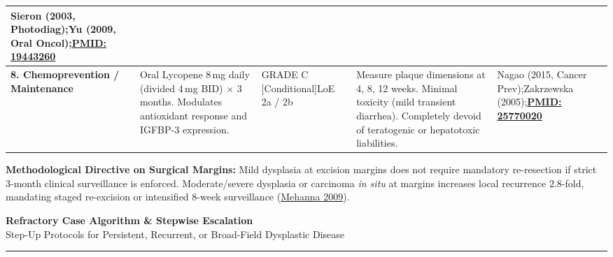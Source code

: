 \documentclass[9pt,a4paper]{article}
\begin{document}
\begin{tabularx}{\linewidth}{>{\raggedright\arraybackslash}p{2.8cm} >{\raggedright\arraybackslash}p{3.8cm} >{\raggedright\arraybackslash}p{2.0cm} >{\raggedright\arraybackslash}p{5.1cm} >{\raggedright\arraybackslash}X}
Sieron (2003, Photodiag);\newline Yu (2009, Oral Oncol);\newline \href{https://pubmed.ncbi.nlm.nih.gov/19443260/}{\textbf{PMID: 19443260}} \\
\midrule
\textbf{8. Chemoprevention / Maintenance} &
Oral Lycopene 8\,mg daily (divided 4\,mg BID) $\times$ 3 months. Modulates antioxidant response and IGFBP-3 expression. &
GRADE C [Conditional]\newline LoE 2a / 2b &
Measure plaque dimensions at 4, 8, 12 weeks. Minimal toxicity (mild transient diarrhea). Completely devoid of teratogenic or hepatotoxic liabilities. &
Nagao (2015, Cancer Prev);\newline Zakrzewska (2005);\newline \href{https://pubmed.ncbi.nlm.nih.gov/25770020/}{\textbf{PMID: 25770020}} \\
\bottomrule
\end{tabularx}

\vspace{5pt}
\textbf{Methodological Directive on Surgical Margins:} Mild dysplasia at excision margins does not require mandatory re-resection if strict 3-month clinical surveillance is enforced. Moderate/severe dysplasia or carcinoma \textit{in situ} at margins increases local recurrence $2.8$-fold, mandating staged re-excision or intensified 8-week surveillance (\href{https://pubmed.ncbi.nlm.nih.gov/19800840/}{Mehanna 2009}).

\clearpage

\begin{center}
{\Large\bfseries Refractory Case Algorithm \& Stepwise Escalation}\\[2pt]
{\small Step-Up Protocols for Persistent, Recurrent, or Broad-Field Dysplastic Disease}
\end{center}
\vspace{-4pt}
\hrule height 0.8pt
\vspace{5pt}
\end{document}
